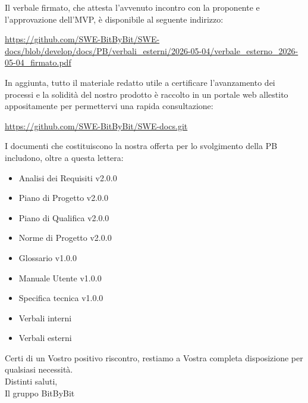 \documentclass[a4paper,12pt]{article}
\begin{document}
Il verbale firmato, che attesta l'avvenuto incontro con la proponente e l'approvazione dell'MVP, è disponibile al seguente indirizzo:
\begin{center}
    \url{https://github.com/SWE-BitByBit/SWE-docs/blob/develop/docs/PB/verbali_esterni/2026-05-04/verbale_esterno_2026-05-04_firmato.pdf}
\end{center}

In aggiunta, tutto il materiale redatto utile a certificare l'avanzamento dei processi e la solidità del nostro prodotto è raccolto in un portale web allestito appositamente per permettervi una rapida consultazione:
\begin{center}
    \url{https://github.com/SWE-BitByBit/SWE-docs.git}
\end{center}

I documenti che costituiscono la nostra offerta per lo svolgimento della PB includono, oltre a questa lettera:
\begin{itemize}[labelsep=0.5cm]
    \item Analisi dei Requisiti v2.0.0
    \item Piano di Progetto v2.0.0
    \item Piano di Qualifica v2.0.0
    \item Norme di Progetto v2.0.0
    \item Glossario v1.0.0
    \item Manuale Utente v1.0.0
    \item Specifica tecnica v1.0.0
    \item Verbali interni
    \item Verbali esterni
\end{itemize}

Certi di un Vostro positivo riscontro, restiamo a Vostra completa disposizione per qualsiasi necessità.\\[0.4cm]
Distinti saluti,\\[0.2cm]
Il gruppo BitByBit
\end{document}
